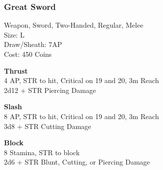 \subsubsection{Great Sword}\label{weapon:greatSword}
Weapon, Sword, Two-Handed, Regular, Melee\\
Size: L\\
Draw/Sheath: 7AP\\
Cost: 450 Coins

\textbf{Thrust}\\
4 AP, STR to hit, Critical on 19 and 20, 3m Reach\\
2d12 + \texttimes STR Piercing Damage

\textbf{Slash}\\
8 AP, STR to hit, Critical on 19 and 20, 3m Reach\\
3d8 + \texttimes STR Cutting Damage

\textbf{Block}\\
8 Stamina, STR to block\\
2d6 + \texttimes STR Blunt, Cutting, or Piercing Damage